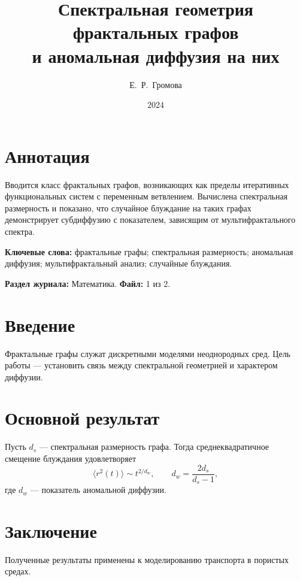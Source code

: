 \documentclass[12pt]{article}
\title{Спектральная геометрия фрактальных графов\\ и аномальная диффузия на них}
\author{Е.~Р.~Громова}
\date{2024}
\begin{document}
\maketitle

\section*{Аннотация}
Вводится класс фрактальных графов, возникающих как пределы итеративных функциональных систем с переменным ветвлением. Вычислена спектральная размерность и показано, что случайное блуждание на таких графах демонстрирует субдиффузию с показателем, зависящим от мультифрактального спектра.

\vspace{0.5cm}
\noindent\textbf{Ключевые слова:} фрактальные графы; спектральная размерность; аномальная диффузия; мультифрактальный анализ; случайные блуждания.

\vspace{0.3cm}
\noindent\textbf{Раздел журнала:} Математика. \quad \textbf{Файл:} 1 из 2.

\section{Введение}
Фрактальные графы служат дискретными моделями неоднородных сред. Цель работы — установить связь между спектральной геометрией и характером диффузии.

\section{Основной результат}
Пусть $d_s$ — спектральная размерность графа. Тогда среднеквадратичное смещение блуждания удовлетворяет
\begin{equation}
\langle r^2(t) \rangle \sim t^{2/d_w}, \qquad d_w = \frac{2 d_s}{d_s - 1},
\end{equation}
где $d_w$ — показатель аномальной диффузии.

\section{Заключение}
Полученные результаты применены к моделированию транспорта в пористых средах.
\end{document}
